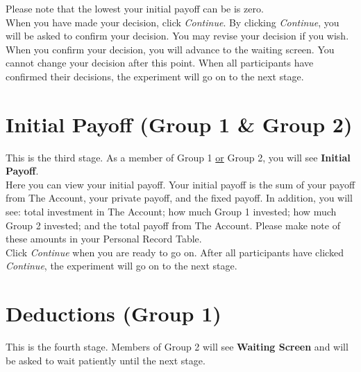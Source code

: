 \documentclass[12pt]{article}
\begin{document}
Please note that the lowest your initial payoff can be is zero.\\ 

When you have made your decision, click {\em Continue}.  By clicking {\em Continue}, you will be asked to confirm your decision.  You may revise your decision if you wish.  When you confirm your decision, you will advance to the waiting screen.  You cannot change your decision after this point. When all participants have confirmed their decisions, the experiment will go on to the next stage. \\ 



\section{Initial Payoff (Group 1 \& Group 2)}

This is the third stage. As a member of Group 1  \underline{or} Group 2, you will see {\bf Initial Payoff}.\\

Here you can view your initial payoff.  Your initial payoff is the sum of your payoff from The Account, your private payoff, and the fixed payoff. In addition, you will see: total investment in The Account; how much Group 1 invested; how much Group 2 invested; and the total payoff from The Account. Please make note of these amounts in your Personal Record Table.\\

Click {\em Continue} when you are ready to go on.  After all participants have clicked {\em Continue}, the experiment will go on to the next stage.\\  



\section{Deductions (Group 1)}

This is the fourth stage. Members of Group 2 will see {\bf Waiting Screen} and will be asked to wait patiently until the next stage.\\   
\end{document}
